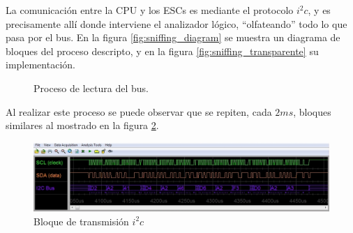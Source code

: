 \documentclass[main]{subfiles}
\begin{document}
La comunicación entre la CPU y los ESCs es mediante el protocolo $i^2c$, y es precisamente allí donde interviene el analizador lógico, ``olfateando'' todo lo que pasa por el bus. En la figura \ref{fig:sniffing_diagram} se muestra un diagrama de bloques del proceso descripto, y en la figura \ref{fig:sniffing_transparente} su implementación.

\begin{figure} [h!]
\centering
  \caption{Proceso de lectura del bus.}
  \label{fig:sniffing}
\end{figure}

Al realizar este proceso se puede observar que se repiten, cada $2ms$, bloques similares al mostrado en la figura \ref{fig:bloque_snif}.

\begin{figure}[h!]
	\centering
	\includegraphics[width=1\textwidth]{./pics_sniffer/bloque_snif.jpg}
	\caption{Bloque de transmisi\'on $i^2c$}
	\label{fig:bloque_snif}
\end{figure}
\end{document}
